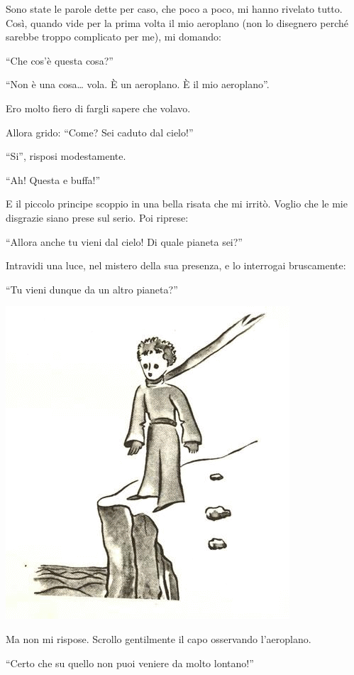\documentclass[11pt]{scrbook}
\begin{document}
Sono state le parole dette per caso, che poco a poco, mi hanno rivelato
tutto. Così, quando vide per la prima volta il mio aeroplano (non lo
disegnero perché sarebbe troppo complicato per me), mi domando:

``Che cos'è questa cosa?''

``Non è una cosa\ldots{} vola. È un aeroplano. È il mio aeroplano''.

Ero molto fiero di fargli sapere che volavo.

Allora grido: ``Come? Sei caduto dal cielo!''

``Si'', risposi modestamente.

``Ah! Questa e buffa!''

E il piccolo principe scoppio in una bella risata che mi irritò. Voglio
che le mie disgrazie siano prese sul serio. Poi riprese:

``Allora anche tu vieni dal cielo! Di quale pianeta sei?''

Intravidi una luce, nel mistero della sua presenza, e lo interrogai
bruscamente:

``Tu vieni dunque da un altro pianeta?''

\begin{center}
\includegraphics{img/3a}
\end{center}

Ma non mi rispose. Scrollo gentilmente il capo osservando l'aeroplano.

``Certo che su quello non puoi veniere da molto lontano!''
\end{document}
